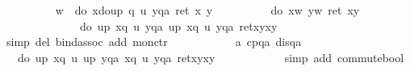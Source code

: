\begin{isabellebody}
\ \ \ \ \ \ \ \ \isamarkupfalse%
\ {\isacharquery}w\ {\isacharequal}\ {\isachardoublequote}do\ {\isacharbraceleft}x{\isasymleftarrow}do{\isacharbraceleft}u{\isasymleftarrow}p{\isacharsemicolon}\ q\ u{\isacharbraceright}{\isacharsemicolon}\ y{\isasymleftarrow}qa{\isacharsemicolon}\ ret\ {\isacharparenleft}x{\isacharcomma}\ y{\isacharparenright}{\isacharbraceright}{\isachardoublequote}\isanewline
\ \ \ \ \ \ \ \ \isamarkupfalse%
\ {\isachardoublequote}do\ {\isacharbraceleft}x{\isasymleftarrow}{\isacharquery}w{\isacharsemicolon}\ y{\isasymleftarrow}{\isacharquery}w{\isacharsemicolon}\ ret\ {\isacharparenleft}x{\isacharcomma}y{\isacharparenright}{\isacharbraceright}\ {\isacharequal}\ \isanewline
\ \ \ \ \ \ \ \ \ \ \ \ \ \ do\ {\isacharbraceleft}u{\isasymleftarrow}p{\isacharsemicolon}\ x{\isasymleftarrow}q\ u{\isacharsemicolon}\ y{\isasymleftarrow}qa{\isacharsemicolon}\ u{\isacharprime}{\isasymleftarrow}p{\isacharsemicolon}\ x{\isacharprime}{\isasymleftarrow}q\ u{\isacharprime}{\isacharsemicolon}\ y{\isacharprime}{\isasymleftarrow}qa{\isacharsemicolon}\ ret{\isacharparenleft}{\isacharparenleft}x{\isacharcomma}y{\isacharparenright}{\isacharcomma}{\isacharparenleft}x{\isacharprime}{\isacharcomma}y{\isacharprime}{\isacharparenright}{\isacharparenright}{\isacharbraceright}{\isachardoublequote}\isanewline
\ \ \ \ \ \ \ \ \ \ \isamarkupfalse%
\ {\isacharparenleft}simp\ del{\isacharcolon}\ bind{\isacharunderscore}assoc\ add{\isacharcolon}\ mon{\isacharunderscore}ctr{\isacharparenright}\isanewline
\ \ \ \ \ \ \ \ \isamarkupfalse%
\ \isamarkupfalse%
\ a{}\ cpqa\ disqa\ \isanewline
\ \ \ \ \ \ \ \ \isamarkupfalse%
\ {\isachardoublequote}{\isasymdots}\ {\isacharequal}\ do\ {\isacharbraceleft}u{\isasymleftarrow}p{\isacharsemicolon}\ x{\isasymleftarrow}q\ u{\isacharsemicolon}\ u{\isacharprime}{\isasymleftarrow}p{\isacharsemicolon}\ y{\isasymleftarrow}qa{\isacharsemicolon}\ x{\isacharprime}{\isasymleftarrow}q\ u{\isacharprime}{\isacharsemicolon}\ y{\isacharprime}{\isasymleftarrow}qa{\isacharsemicolon}\ ret{\isacharparenleft}{\isacharparenleft}x{\isacharcomma}y{\isacharparenright}{\isacharcomma}{\isacharparenleft}x{\isacharprime}{\isacharcomma}y{\isacharprime}{\isacharparenright}{\isacharparenright}{\isacharbraceright}{\isachardoublequote}\isanewline
\ \ \ \ \ \ \ \ \ \ \isamarkupfalse%
\ {\isacharparenleft}simp\ add{\isacharcolon}\ commute{\isacharunderscore}bool{\isacharparenright}\isanewline
\ \ \ \ \ \ \ \ \isamarkupfalse%
\ \isamarkupfalse%

\end{isabellebody}
